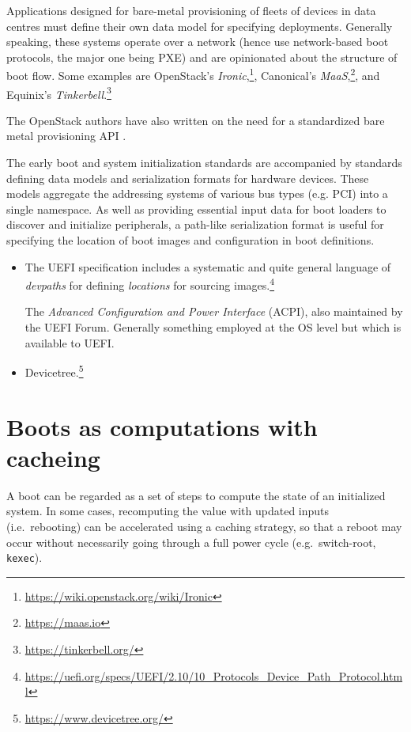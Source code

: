 Applications designed for bare-metal provisioning of fleets of devices in data centres must define their own data model for specifying deployments.
%
Generally speaking, these systems operate over a network (hence use network-based boot protocols, the major one being PXE) and are opinionated about the structure of boot flow.
%
Some examples are OpenStack's \emph{Ironic},\footnote{\url{https://wiki.openstack.org/wiki/Ironic}}, Canonical's \emph{MaaS},\footnote{\url{https://maas.io}}, and Equinix's \emph{Tinkerbell}.\footnote{\url{https://tinkerbell.org/}}

The OpenStack authors have also written on the need for a standardized bare metal provisioning API \cite{openstack2023building}.

The early boot and system initialization standards are accompanied by standards defining data models and serialization formats for hardware devices.
%
These models aggregate the addressing systems of various bus types (e.g. PCI) into a single namespace.
%
As well as providing essential input data for boot loaders to discover and initialize peripherals, a path-like serialization format is useful for specifying the location of boot images and configuration in boot definitions.
\begin{itemize}
  \item
    The UEFI specification includes a systematic and quite general language of \emph{devpaths} for defining \emph{locations} for sourcing images.\footnote{\url{https://uefi.org/specs/UEFI/2.10/10\_Protocols\_Device\_Path\_Protocol.html}}

    The \emph{Advanced Configuration and Power Interface} (ACPI), also maintained by the UEFI Forum. Generally something employed at the OS level but which is available to UEFI.
    
  \item
    Devicetree.\footnote{\url{https://www.devicetree.org/}}
\end{itemize}

\hypertarget{boots-as-computations-with-cacheing}{%
\section{Boots as computations with
cacheing}\label{boots-as-computations-with-cacheing}}

A boot can be regarded as a set of steps to compute the state of an
initialized system. In some cases, recomputing the value with updated
inputs (i.e.~rebooting) can be accelerated using a caching strategy, so
that a reboot may occur without necessarily going through a full power
cycle (e.g.~switch-root, \texttt{kexec}).

